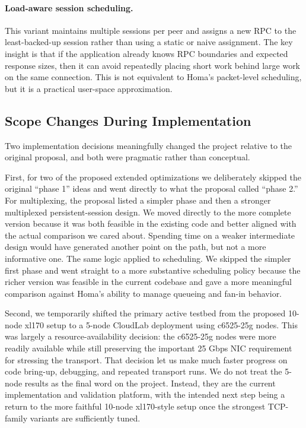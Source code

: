 \documentclass[11pt]{article}
\begin{document}
\paragraph{Load-aware session scheduling.}
This variant maintains multiple sessions per peer and assigns a new RPC to the least-backed-up session rather than using a static or naive assignment. The key insight is that if the application already knows RPC boundaries and expected response sizes, then it can avoid repeatedly placing short work behind large work on the same connection. This is not equivalent to Homa's packet-level scheduling, but it is a practical user-space approximation.

\subsection{Scope Changes During Implementation}

Two implementation decisions meaningfully changed the project relative to the original proposal, and both were pragmatic rather than conceptual.

First, for two of the proposed extended optimizations we deliberately skipped the original ``phase 1'' ideas and went directly to what the proposal called ``phase 2.'' For multiplexing, the proposal listed a simpler phase and then a stronger multiplexed persistent-session design. We moved directly to the more complete version because it was both feasible in the existing code and better aligned with the actual comparison we cared about. Spending time on a weaker intermediate design would have generated another point on the path, but not a more informative one. The same logic applied to scheduling. We skipped the simpler first phase and went straight to a more substantive scheduling policy because the richer version was feasible in the current codebase and gave a more meaningful comparison against Homa's ability to manage queueing and fan-in behavior.

Second, we temporarily shifted the primary active testbed from the proposed 10-node xl170 setup to a 5-node CloudLab deployment using c6525-25g nodes. This was largely a resource-availability decision: the c6525-25g nodes were more readily available while still preserving the important 25 Gbps NIC requirement for stressing the transport. That decision let us make much faster progress on code bring-up, debugging, and repeated transport runs. We do not treat the 5-node results as the final word on the project. Instead, they are the current implementation and validation platform, with the intended next step being a return to the more faithful 10-node xl170-style setup once the strongest TCP-family variants are sufficiently tuned.
\end{document}
